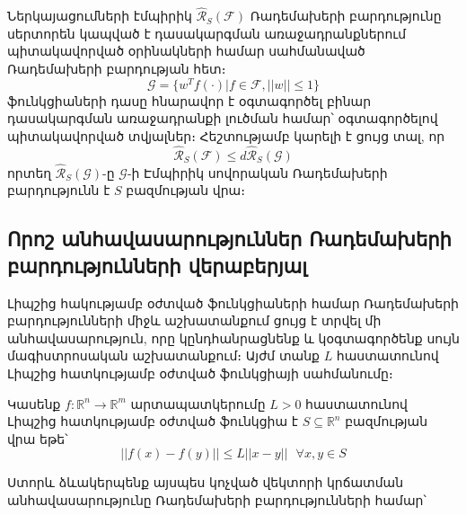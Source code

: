 \documentclass[12pt]{article}
\begin{document}
\begin{remark*}
Ներկայացումների էմպիրիկ $\mathcal{\hat{R}}_S(\mathcal{F})$ Ռադեմախերի բարդությունը սերտորեն կապված է դասակարգման առաջադրանքներում պիտակավորված օրինակների համար սահմանաված Ռադեմախերի բարդության հետ։ $$\mathcal{G}  = \{w^Tf(\cdot)| f \in \mathcal{F}, ||w|| \leq 1 \}$$
ֆունկցիաների դասը հնարավոր է օգտագործել բինար դասակարգման առաջադրանքի լուծման համար՝ օգտագործելով պիտակավորված տվյալներ։ Հեշտությամբ կարելի է ցույց տալ, որ $$\hat{\mathcal{R}}_S(\mathcal{F}) \leq d \hat{\mathcal{R}}_S(\mathcal{G})$$
որտեղ $\hat{\mathcal{R}}_S(\mathcal{G})$-ը $\mathcal{G}$-ի Էմպիրիկ  սովորական Ռադեմախերի բարդությունն է $S$ բազմության վրա։
\end{remark*}


{}


\subsection*{ \centering Որոշ անհավասարություններ Ռադեմախերի \\ բարդությունների վերաբերյալ } \noindent



Լիպշից հակությամբ օժտված ֆունկցիաների համար Ռադեմախերի բարդությունների միջև \cite{bib_item_11} աշխատանքում ցույց է տրվել մի անհավասարություն, որը կընդհանրացնենք և կօգտագործենք սույն մագիստրոսական աշխատանքում։  Այժմ տանք $L$ հաստատունով Լիպշից հատկությամբ օժտված ֆունկցիայի սահմանումը։
\begin{defination}
Կասենք $f:\mathbb{R}^n \rightarrow \mathbb{R}^m$ արտապատկերումը $L > 0$ հաստատունով Լիպշից հատկությամբ օժտված ֆունկցիա է $S \subseteq \mathbb{R}^n$ բազմության վրա եթե՝
$$||f(x)-f(y)|| \leq L||x-y||   \text{ } \forall x, y \in S$$ 
\end{defination}

Ստորև ձևակերպենք այսպես կոչված վեկտորի կրճատման անհավասարությունը Ռադեմախերի բարդությունների համար՝
\end{document}

